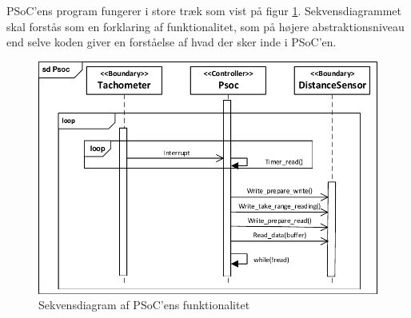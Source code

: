 PSoC'ens program fungerer i store træk som vist på figur \ref{fig:sd_main_psoc}. Sekvensdiagrammet skal forstås som en forklaring af funktionalitet, som på højere abstraktionsniveau end selve koden giver en forståelse af hvad der sker inde i PSoC'en. 

\begin{figure}[h]
	\centering
	\includegraphics[]{../fig/diagrammer/psoc/sd_psoc.pdf}
	\caption{Sekvensdiagram af PSoC'ens funktionalitet}
	\label{fig:sd_main_psoc}
\end{figure}

\clearpage

